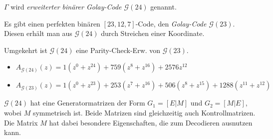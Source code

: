 \documentclass{cheat-sheet}
\newcommand{\F}{\mathbb{F}} %
\DeclareMathOperator{\wt}{wt} %
\newcommand{\Golay}{\mathcal{G}} %
\begin{document}
\begin{defn}
  $\Gamma$ wird \emph{erweiterter binärer Golay-Code $\Golay(24)$} genannt.
\end{defn}


\begin{satz}
  Es gibt einen perfekten binären $[23, 12, 7]$-Code, den \emph{Golay-Code $\Golay(23)$}.
  Diesen erhält man aus $\Golay(24)$ durch Streichen einer Koordinate.
\end{satz}

\begin{bem}
  Umgekehrt ist $\Golay(24)$ eine Parity-Check-Erw. von $\Golay(23)$.
\end{bem}

\begin{satz}
  \begin{itemize}
    \item $A_{\Golay(24)}(z) = 1 (z^0 + z^{24}) + 759 (z^8 + z^{16}) + 2576 z^{12}$
    \item $A_{\Golay(23)}(z) = 1 (z^0 \!+\! z^{23}) + 253 (z^7 \!+\! z^{16}) + 506 (z^8 \!+\! z^{15}) + 1288 (z^{11} \!+\! z^{12})$
  \end{itemize}
\end{satz}

\begin{bem}
  $\Golay(24)$ hat eine Generatormatrizen der Form $G_1 = [E|M]$ und $G_2 = [M|E]$, wobei $M$ symmetrisch ist.
  Beide Matrizen sind gleichzeitig auch Kontrollmatrizen.
  Die Matrix $M$ hat dabei besondere Eigenschaften, die zum Decodieren ausnutzen kann.
\end{bem}

\iffalse
  Decodierung: Schreibe $x \in \F_2^{24}$ als $x_1 | x_2$ mit $x_1, x_2 \in \F_2^{12}$.
  Berechne Syndome $S_1 = G_1 y = G_1 e = e_1 + M e_2$ und $S_2 = G_2 y = M e_1 + e_2$.
  Es gilt:
  \begin{itemize}
    \item $\wt(S_1) \leq 3 \iff e_2 = 0 \implies S_1 = e_1 \implies e = e_1 | 0 = S_1 | 0$
    \item $\wt(S_2) \leq 3 \implies e_1 = 0 \implies S_2 = e_2 \implies e = 0 | S_2$
  \end{itemize}
  $\wt(S_1), \wt(S_2) \geq 4$.
  Berechne $S_i = G_2 \cdot (y + (\epsilon_i|0)) = m(e_1 + \epsilon_i) + e_2$
  Beachte: $(\wt(e_1), \wt(e_2)) \in \{ (1,2), (1,1), (2,1) \}$
  $\wt(e_1) = 2 \iff \wt(S_i) \geq 4$ für alle $i = 1, \ldots, 12$
  $\wt(e_1) = 1 \iff$ es gibt genau ein $l$ mit $\wt(s_l) \leq 2$ nämlich das $l$ wodurch $e_1 = \epsilon_l$
\fi
\end{document}
